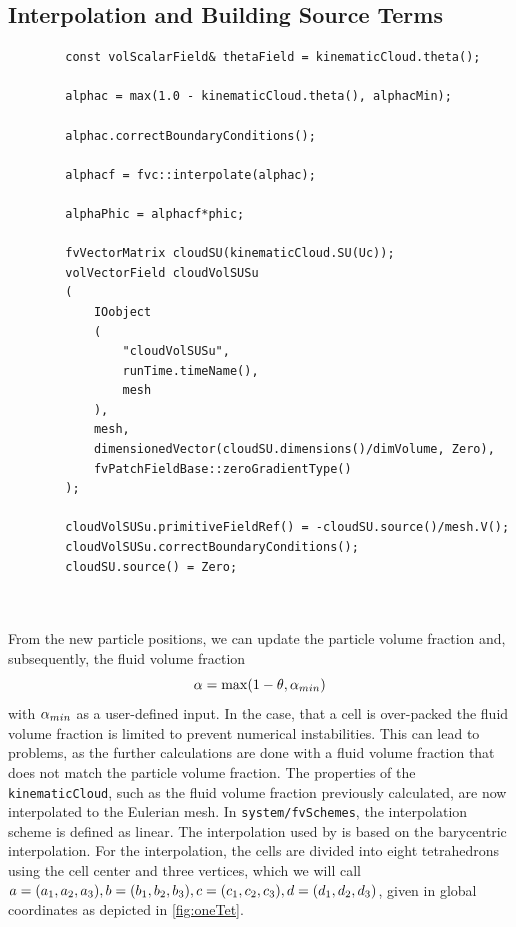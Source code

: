 \subsection{Interpolation and Building Source Terms}
\label{sec:OFInterpolation}
\ifcode
\begin{lstlisting}
        const volScalarField& thetaField = kinematicCloud.theta();
    
        alphac = max(1.0 - kinematicCloud.theta(), alphacMin);
        
        alphac.correctBoundaryConditions();
        
        alphacf = fvc::interpolate(alphac);
        
        alphaPhic = alphacf*phic;
        
        fvVectorMatrix cloudSU(kinematicCloud.SU(Uc));
        volVectorField cloudVolSUSu
        (
            IOobject
            (
                "cloudVolSUSu",
                runTime.timeName(),
                mesh
            ),
            mesh,
            dimensionedVector(cloudSU.dimensions()/dimVolume, Zero),
            fvPatchFieldBase::zeroGradientType()
        );

        cloudVolSUSu.primitiveFieldRef() = -cloudSU.source()/mesh.V();
        cloudVolSUSu.correctBoundaryConditions();
        cloudSU.source() = Zero;



\end{lstlisting}
\fi
From the new particle positions, we can update the particle volume fraction and, subsequently, the fluid volume fraction
\begin{equation}
\label{eq:maxAlpha}
    \alpha = \max (1-\theta,\alpha_{min})
\end{equation}
with $\alpha_{min}$ as a user-defined input. 
In the case, that a cell is over-packed the fluid volume fraction is limited to prevent numerical instabilities. This can lead to problems, as the further calculations are done with a fluid volume fraction that does not match the particle volume fraction.
The properties of the \lstinline|kinematicCloud|, such as the fluid volume fraction previously calculated, are now interpolated to the Eulerian mesh.
In \lstinline|system/fvSchemes|, the interpolation scheme is defined as linear. 
The interpolation used by \OF is based on the barycentric interpolation.
For the interpolation, the cells are divided into eight tetrahedrons using the cell center and three vertices, which we will call $a = (a_1, a_2, a_3),b = (b_1, b_2, b_3),c = (c_1, c_2, c_3),d = (d_1, d_2, d_3)$, given in global coordinates as depicted in \ref{fig:oneTet}.\hfill

